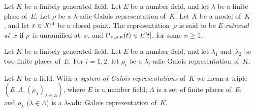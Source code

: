 \documentclass[10pt,twoside,leqno]{article}
\numberwithin{equation}{subsection}
\newcommand{\cl}{\textnormal{cl}}
\begin{document}
\begin{definition} %
 \label{rational-galois-representation}
	Let $K$ be a finitely generated field.
 Let $E$ be a number field,
 and let $\lambda$ be a finite place of~$E$.
 Let $\rho$ be a $\lambda$-adic Galois representation of~$K$.
 Let $X$ be a model of~$K$,
 and let $x \in X^\cl$ be a closed point.
 The representation~$\rho$ is said to be \emph{$E$-rational at~$x$} if
 $\rho$~is unramified at~$x$,
 and $\mathrm{P}_{x,\rho,n}(t) \in E[t]$,
 for some $n \ge 1$.
\end{definition}

\begin{definition} %
 \label{quasi-compatible-representations}
	Let $K$ be a finitely generated field.
 Let $E$ be a number field, and
 let $\lambda_{1}$ and~$\lambda_{2}$ be two finite places of~$E$.
 For $i = 1,2$, let $\rho_{i}$ be
 a $\lambda_{i}$-adic Galois representation of~$K$.
\end{definition}

\begin{definition} %
 \label{system-galois-representations}
 Let $K$ be a field.
 With a \emph{system of Galois representations} of~$K$ we mean a triple
 $(E, \Lambda, (\rho_{\lambda})_{\lambda \in \Lambda})$,
 where
 $E$ is a number field;
 $\Lambda$ is a set of finite places of~$E$; and
 $\rho_{\lambda}$ ($\lambda \in \Lambda$)
 is a $\lambda$-adic Galois representation of~$K$.
\end{definition}
\end{document}
